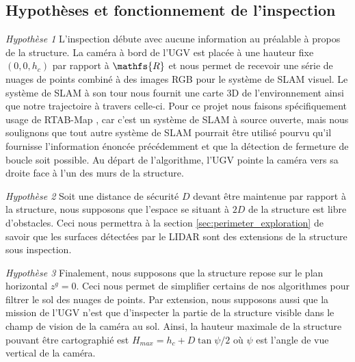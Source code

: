 
\subsection{Hypothèses et fonctionnement de l'inspection}
\label{sec:ugv_hypothesis}

\textit{Hypothèse 1} L'inspection débute avec aucune information au préalable à propos de la structure. La caméra à bord de l'UGV est placée à une hauteur fixe $(0,0,h_c)$ par rapport à $\mathfs{R}$ et nous permet de recevoir une série de nuages de points combiné à des images RGB pour le système de SLAM visuel. Le système de SLAM à son tour nous fournit une carte 3D de l'environnement ainsi que notre trajectoire à travers celle-ci. Pour ce projet nous faisons spécifiquement usage de RTAB-Map \citep{Labbe2014}, car c'est un système de SLAM à source ouverte, mais nous soulignons que tout autre système de SLAM pourrait être utilisé pourvu qu'il fournisse l'information énoncée précédemment et que la détection de fermeture de boucle soit possible. Au départ de l'algorithme, l'UGV pointe la caméra vers sa droite face à l'un des murs de la structure.

\textit{Hypothèse 2} Soit une distance de sécurité $D$ devant être maintenue par rapport à la structure, nous supposons que l'espace se situant à $2D$ de la structure est libre d'obstacles. Ceci nous permettra à la section \ref{sec:perimeter_exploration} de savoir que les surfaces détectées par le LIDAR sont des extensions de la structure sous inspection.

\textit{Hypothèse 3} Finalement, nous supposons que la structure repose sur le plan horizontal $z^g = 0$. Ceci nous permet de simplifier certains de nos algorithmes pour filtrer le sol des nuages de points. Par extension, nous supposons aussi que la mission de l'UGV n'est que d'inspecter la partie de la structure visible dans le champ de vision de la caméra au sol. Ainsi, la hauteur maximale de la structure pouvant être cartographié est $H_{max} = h_c + D \tan{\psi/2}$ où $\psi$ est l'angle de vue vertical de la caméra.

